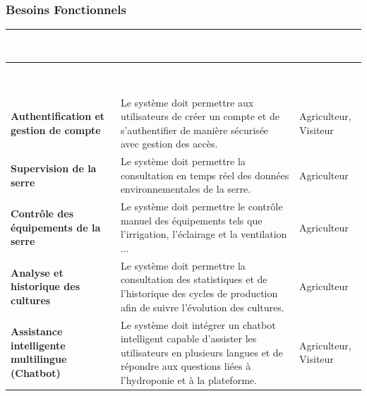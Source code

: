 \subsubsection{Besoins Fonctionnels}

\begingroup
\footnotesize %
\setlength{\tabcolsep}{4pt} %
\renewcommand{\arraystretch}{1.2} %

\begin{longtable}{|p{}|>{\raggedright\arraybackslash}p{}|>{\raggedright\arraybackslash}p{}|}
	\hline
	\rowcolor[HTML]{2C3E50}
	\textcolor{white}{\textbf{Besoin}} &
	\textcolor{white}{\textbf{Description}} &
	\textcolor{white}{\textbf{Acteur Concerné}} \\ \hline
	\endfirsthead
	
	\hline
	\rowcolor[HTML]{2C3E50}
	\textcolor{white}{\textbf{Besoin}} &
	\textcolor{white}{\textbf{Description}} &
	\textcolor{white}{\textbf{Acteur Concerné}} \\ \hline
	\endhead
	
	\textbf{Authentification et gestion de compte} &
	Le système doit permettre aux utilisateurs de créer un compte et de s’authentifier de manière sécurisée avec gestion des accès. &
	Agriculteur, Visiteur \\ \hline
	
	\textbf{Supervision de la serre} &
	Le système doit permettre la consultation en temps réel des données environnementales de la serre. &
	Agriculteur \\ \hline
	
	\textbf{Contrôle des équipements de la serre} &
	Le système doit permettre le contrôle manuel des équipements tels que l’irrigation, l’éclairage et la ventilation ... &
	Agriculteur \\ \hline
	
	\textbf{Analyse et historique des cultures} &
	Le système doit permettre la consultation des statistiques et de l’historique des cycles de production afin de suivre l’évolution des cultures. &
	Agriculteur \\ \hline
	
	\textbf{Assistance intelligente multilingue (Chatbot)} &
	Le système doit intégrer un chatbot intelligent capable d’assister les utilisateurs en plusieurs langues et de répondre aux questions liées à l’hydroponie et à la plateforme. &
	Agriculteur, Visiteur \\ \hline
	

\end{longtable}
